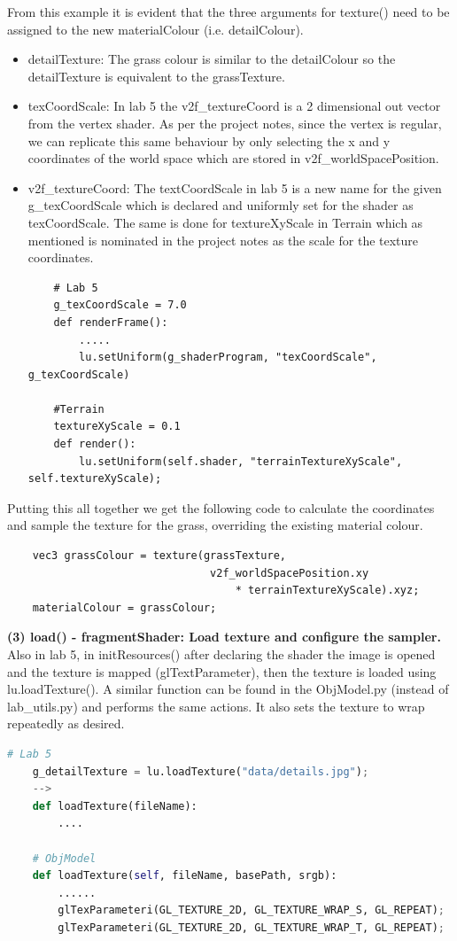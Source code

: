 \documentclass[a4 paper, 12pt]{article}
\begin{document}
From this example it is evident that the three arguments for texture() need to be assigned to the new materialColour (i.e. detailColour).
    \begin{itemize}
        \item detailTexture: The grass colour is similar to the detailColour so the detailTexture is equivalent to the grassTexture.
        \item texCoordScale: In lab 5 the v2f\_textureCoord is a 2 dimensional out vector from the vertex shader. As per the project notes, since the vertex is regular, we can replicate this same behaviour by only selecting the x and y coordinates of the world space which are stored in v2f\_worldSpacePosition.
        \item v2f\_textureCoord: The textCoordScale in lab 5 is a new name for the given g\_texCoordScale which is declared and uniformly set for the shader as texCoordScale. The same is done for textureXyScale in Terrain which as mentioned is nominated in the project notes as the scale for the texture coordinates.    
    \begin{lstlisting}
    # Lab 5 
    g_texCoordScale = 7.0
    def renderFrame():
        .....
        lu.setUniform(g_shaderProgram, "texCoordScale", g_texCoordScale)

    #Terrain
    textureXyScale = 0.1
    def render():
        lu.setUniform(self.shader, "terrainTextureXyScale", self.textureXyScale);
    \end{lstlisting}
    \end{itemize}

Putting this all together we get the following code to calculate the coordinates and sample the texture for the grass, overriding the existing material colour.
    \begin{lstlisting}
    vec3 grassColour = texture(grassTexture, 
                                v2f_worldSpacePosition.xy 
                                    * terrainTextureXyScale).xyz;
    materialColour = grassColour;
    \end{lstlisting}

\textbf{(3) load() - fragmentShader: Load texture and configure the sampler.} \\
Also in lab 5, in initResources() after declaring the shader the image is opened and the texture is mapped (glTextParameter), then the texture is loaded using lu.loadTexture(). A similar function can be found in the ObjModel.py (instead of lab\_utils.py) and performs the same actions. It also sets the texture to wrap repeatedly as desired.
    \begin{lstlisting}[language=python]   
    # Lab 5 
    g_detailTexture = lu.loadTexture("data/details.jpg");
    --> 
    def loadTexture(fileName): 
        ....

    # ObjModel
    def loadTexture(self, fileName, basePath, srgb):
        ......
        glTexParameteri(GL_TEXTURE_2D, GL_TEXTURE_WRAP_S, GL_REPEAT);
        glTexParameteri(GL_TEXTURE_2D, GL_TEXTURE_WRAP_T, GL_REPEAT);
    \end{lstlisting}
\end{document}
